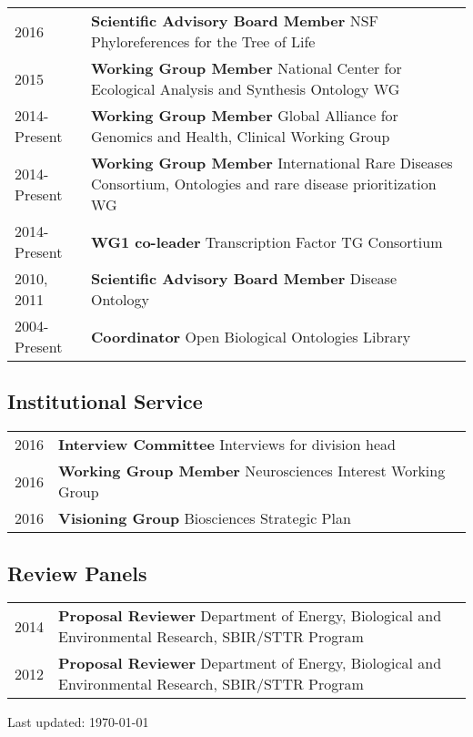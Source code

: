 \documentclass[11pt,fullpage]{article}
\begin{document}
\begin{longtable}{p{0.5in}|p{5.5in}}

  2016  & \textbf{Scientific Advisory Board Member} NSF Phyloreferences for the Tree of Life \\
  2015  & \textbf{Working Group Member}  National Center for Ecological Analysis and Synthesis Ontology WG \\
  2014-Present  & \textbf{Working Group Member}  Global Alliance for Genomics and Health, Clinical Working Group \\
  2014-Present  & \textbf{Working Group Member}  International Rare Diseases Consortium, Ontologies and rare disease prioritization WG \\
  2014-Present  & \textbf{WG1 co-leader} Transcription Factor TG Consortium \\
  2010, 2011 & \textbf{Scientific Advisory Board Member} Disease Ontology \\
  2004-Present  & \textbf{Coordinator} Open Biological Ontologies Library \\

\end{longtable}

\subsection*{Institutional Service}

\begin{longtable}{p{0.5in}|p{5.5in}}

  2016 & \textbf{Interview Committee} Interviews for division head \\
  2016 & \textbf{Working Group Member} Neurosciences Interest Working Group \\
  2016 & \textbf{Visioning Group} Biosciences Strategic Plan \\

\end{longtable}

\subsection*{Review Panels}

\begin{longtable}{p{0.5in}|p{5.5in}}

  2014 & \textbf{Proposal Reviewer} Department of Energy, Biological and Environmental Research, SBIR/STTR Program \\
  2012 & \textbf{Proposal Reviewer} Department of Energy, Biological and Environmental Research, SBIR/STTR Program \\

\end{longtable}

  


\bigskip
\begin{center}
  \begin{footnotesize}
    Last updated: \today
  \end{footnotesize}
\end{center}

\end{document}
